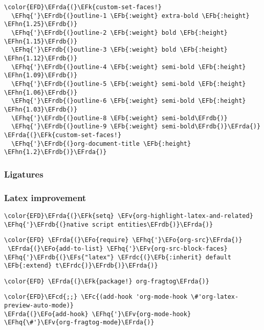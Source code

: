 \documentclass[12pt]{article}
\theoremstyle{plain}%
\theoremstyle{definition}
\theoremstyle{remark}
\newcommand{\EFc}[1]{\textcolor{EFc}{#1}} %
\newcommand{\EFcd}[1]{\textcolor{EFcd}{#1}} %
\newcommand{\EFs}[1]{\textcolor{EFs}{#1}} %
\newcommand{\EFk}[1]{\textcolor{EFk}{#1}} %
\newcommand{\EFb}[1]{\textcolor{EFb}{#1}} %
\newcommand{\EFv}[1]{\textcolor{EFv}{#1}} %
\newcommand{\EFo}[1]{\textcolor{EFo}{#1}} %
\newcommand{\EFhn}[1]{\textcolor{EFhn}{\textbf{#1}}} %
\newcommand{\EFhq}[1]{\textcolor{EFhq}{#1}} %
\newcommand{\EFrda}[1]{\textcolor{EFrda}{#1}} %
\newcommand{\EFrdb}[1]{\textcolor{EFrdb}{#1}} %
\newcommand{\EFrdc}[1]{\textcolor{EFrdc}{#1}} %
\begin{document}
\begin{Code}
\begin{Verbatim}
\color{EFD}\EFrda{(}\EFk{custom-set-faces!}
  \EFhq{'}\EFrdb{(}outline-1 \EFb{:weight} extra-bold \EFb{:height} \EFhn{1.25}\EFrdb{)}
  \EFhq{'}\EFrdb{(}outline-2 \EFb{:weight} bold \EFb{:height} \EFhn{1.15}\EFrdb{)}
  \EFhq{'}\EFrdb{(}outline-3 \EFb{:weight} bold \EFb{:height} \EFhn{1.12}\EFrdb{)}
  \EFhq{'}\EFrdb{(}outline-4 \EFb{:weight} semi-bold \EFb{:height} \EFhn{1.09}\EFrdb{)}
  \EFhq{'}\EFrdb{(}outline-5 \EFb{:weight} semi-bold \EFb{:height} \EFhn{1.06}\EFrdb{)}
  \EFhq{'}\EFrdb{(}outline-6 \EFb{:weight} semi-bold \EFb{:height} \EFhn{1.03}\EFrdb{)}
  \EFhq{'}\EFrdb{(}outline-8 \EFb{:weight} semi-bold\EFrdb{)}
  \EFhq{'}\EFrdb{(}outline-9 \EFb{:weight} semi-bold\EFrdb{)}\EFrda{)}
\EFrda{(}\EFk{custom-set-faces!}
  \EFhq{'}\EFrdb{(}org-document-title \EFb{:height} \EFhn{1.2}\EFrdb{)}\EFrda{)}
\end{Verbatim}
\end{Code}

\subsubsection{Ligatures}
\label{sec:org8d46623}
\subsubsection{Latex improvement}
\label{sec:org01054e3}
\begin{Code}
\begin{Verbatim}
\color{EFD}\EFrda{(}\EFk{setq} \EFv{org-highlight-latex-and-related} \EFhq{'}\EFrdb{(}native script entities\EFrdb{)}\EFrda{)}
\end{Verbatim}
\end{Code}
\begin{Code}
\begin{Verbatim}
\color{EFD} \EFrda{(}\EFo{require} \EFhq{'}\EFo{org-src}\EFrda{)}
 \EFrda{(}\EFo{add-to-list} \EFhq{'}\EFv{org-src-block-faces} \EFhq{'}\EFrdb{(}\EFs{"latex"} \EFrdc{(}\EFb{:inherit} default \EFb{:extend} t\EFrdc{)}\EFrdb{)}\EFrda{)}
\end{Verbatim}
\end{Code}
\begin{Code}
\begin{Verbatim}
\color{EFD} \EFrda{(}\EFk{package!} org-fragtog\EFrda{)}
\end{Verbatim}
\end{Code}
\begin{Code}
\begin{Verbatim}
\color{EFD}\EFcd{;;} \EFc{(add-hook 'org-mode-hook \#'org-latex-preview-auto-mode)}
\EFrda{(}\EFo{add-hook} \EFhq{'}\EFv{org-mode-hook} \EFhq{\#'}\EFv{org-fragtog-mode}\EFrda{)}
\end{Verbatim}
\end{Code}
\end{document}
